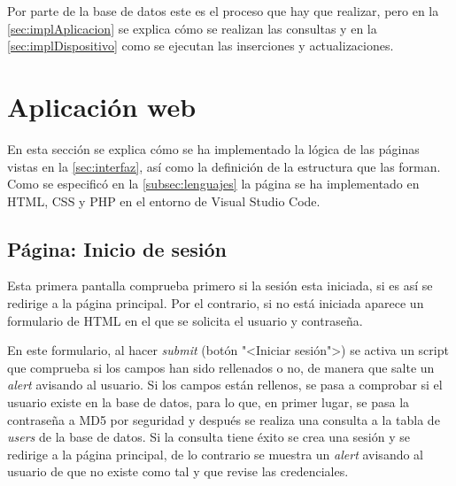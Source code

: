 Por parte de la base de datos este es el proceso que hay que realizar, pero en la \autoref{sec:implAplicacion} se explica cómo se realizan las consultas y en la \autoref{sec:implDispositivo} como se ejecutan las inserciones y actualizaciones.

\section{Aplicación web}\label{sec:implAplicacion}
En esta sección se explica cómo se ha implementado la lógica de las páginas vistas en la \autoref{sec:interfaz}, así como la definición de la estructura que las forman. Como se especificó en la \autoref{subsec:lenguajes} la página se ha implementado en HTML, CSS y PHP en el entorno de Visual Studio Code.

\subsection{Página: Inicio de sesión}\label{subsec:página-inicio-de-sesión}
Esta primera pantalla comprueba primero si la sesión esta iniciada, si es así se redirige a la página principal. Por el contrario, si no está iniciada aparece un formulario de HTML en el que se solicita el usuario y contraseña. 

En este formulario, al hacer \textit{submit} (botón "<Iniciar sesión">) se activa un script que comprueba si los campos han sido rellenados o no, de manera que salte un \textit{alert} avisando al usuario. Si los campos están rellenos, se pasa a comprobar si el usuario existe en la base de datos, para lo que, en primer lugar, se pasa la contraseña a MD5 por seguridad y después se realiza una consulta a la tabla de \textit{users} de la base de datos. Si la consulta tiene éxito se crea una sesión y se redirige a la página principal, de lo contrario se muestra un \textit{alert} avisando al usuario de que no existe como tal y que revise las credenciales.

